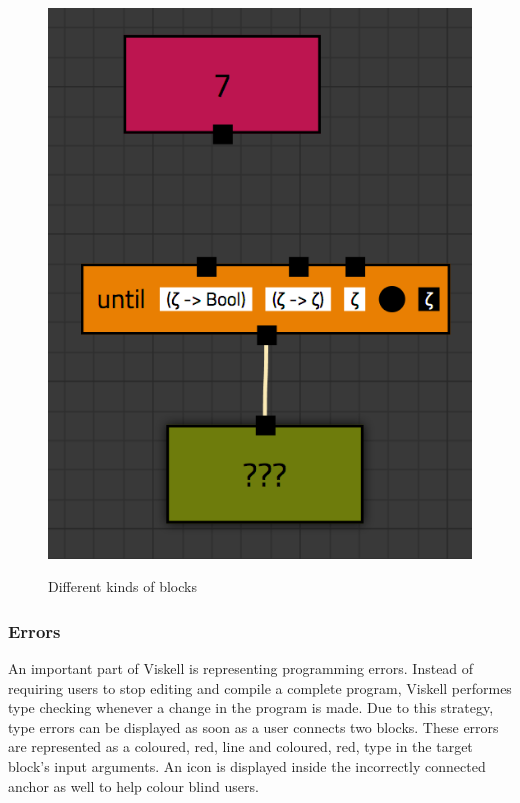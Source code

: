 \begin{figure}[p]
	\centering
	\includegraphics[scale=0.5]{Images/blocks-example}
	\label{fig:blocks-example}
	\caption{Different kinds of blocks}
\end{figure}

\subsubsection{Errors}

An important part of Viskell is representing programming errors.
Instead of requiring users to stop editing and compile a complete program, Viskell performes type checking whenever a change in the program is made. Due to this strategy, type errors can be displayed as soon as a user connects two blocks. These errors are represented as a coloured, red, line and coloured, red, type in the target block's input arguments. An icon is displayed inside the incorrectly connected anchor as well to help colour blind users.

